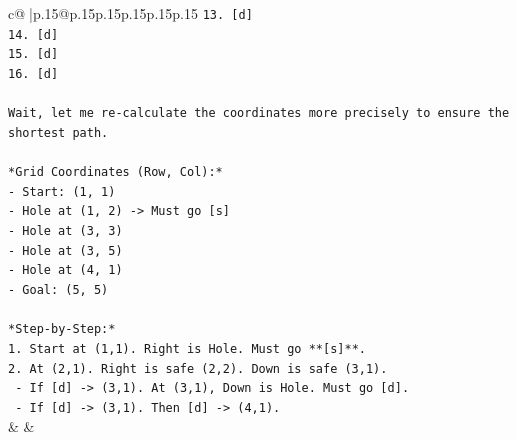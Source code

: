 \documentclass{article}
\begin{document}
{\begin{supertabular}{c@{$\;$}|p{.15\linewidth}@{}p{.15\linewidth}p{.15\linewidth}p{.15\linewidth}p{.15\linewidth}p{.15\linewidth}}
{{{\texttt{13. {[}d{]}} \\
\texttt{14. {[}d{]}} \\
\texttt{15. {[}d{]}} \\
\texttt{16. {[}d{]}} \\
\\ 
\texttt{Wait, let me re{-}calculate the coordinates more precisely to ensure the shortest path.} \\
\\ 
\texttt{*Grid Coordinates (Row, Col):*} \\
\texttt{{-} Start: (1, 1)} \\
\texttt{{-} Hole at (1, 2) {-}> Must go {[}s{]}} \\
\texttt{{-} Hole at (3, 3)} \\
\texttt{{-} Hole at (3, 5)} \\
\texttt{{-} Hole at (4, 1)} \\
\texttt{{-} Goal: (5, 5)} \\
\\ 
\texttt{*Step{-}by{-}Step:*} \\
\texttt{1.  Start at (1,1). Right is Hole. Must go **{[}s{]}**.} \\
\texttt{2.  At (2,1). Right is safe (2,2). Down is safe (3,1).} \\
\texttt{    {-}   If {[}d{]} {-}> (3,1). At (3,1), Down is Hole. Must go {[}d{]}.} \\
\texttt{    {-}   If {[}d{]} {-}> (3,1). Then {[}d{]} {-}> (4,1).} \\
            }
        }
    }
    & & \\ \\


\end{supertabular}}
\end{document}

